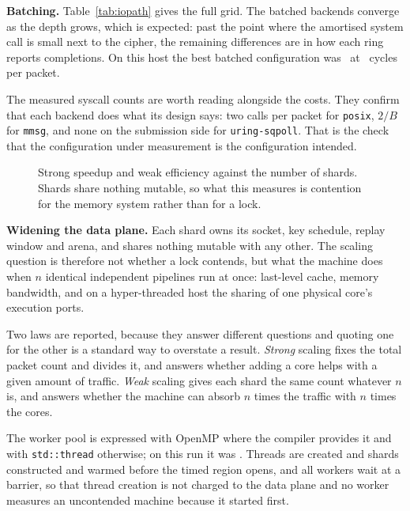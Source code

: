 \noindent\textbf{Batching.}
Table~\ref{tab:iopath} gives the full grid. The batched backends converge as the
depth grows, which is expected: past the point where the amortised system call
is small next to the cipher, the remaining differences are in how each ring
reports completions. On this host the best batched configuration was
\ioBestBatched\ at \ioBestBatchedCycles\ cycles per packet.

The measured syscall counts are worth reading alongside the costs. They confirm
that each backend does what its design says: two calls per packet for
\texttt{posix}, $2/B$ for \texttt{mmsg}, and none on the submission side for
\texttt{uring-sqpoll}. That is the check that the configuration under
measurement is the configuration intended.

\begin{table}[t]
\caption{Transport grid at payload \protoMaxPayload\ bytes.}
\label{tab:iopath}
\centering\footnotesize

\end{table}

\begin{figure}[t]
\centering
{}
\caption{Strong speedup and weak efficiency against the number of shards. Shards
share nothing mutable, so what this measures is contention for the memory system
rather than for a lock.}
\label{fig:scaling}
\end{figure}

\noindent\textbf{Widening the data plane.}
Each shard owns its socket, key schedule, replay window and arena, and shares
nothing mutable with any other. The scaling question is therefore not whether a
lock contends, but what the machine does when $n$ identical independent
pipelines run at once: last-level cache, memory bandwidth, and on a
hyper-threaded host the sharing of one physical core's execution ports.

Two laws are reported, because they answer different questions and quoting one
for the other is a standard way to overstate a result. \emph{Strong} scaling
fixes the total packet count and divides it, and answers whether adding a core
helps with a given amount of traffic. \emph{Weak} scaling gives each shard the
same count whatever $n$ is, and answers whether the machine can absorb $n$ times
the traffic with $n$ times the cores.

The worker pool is expressed with OpenMP where the compiler provides it and with
\texttt{std::thread} otherwise; on this run it was \scalePool. Threads are
created and shards constructed and warmed before the timed region opens, and all
workers wait at a barrier, so that thread creation is not charged to the data
plane and no worker measures an uncontended machine because it started first.

